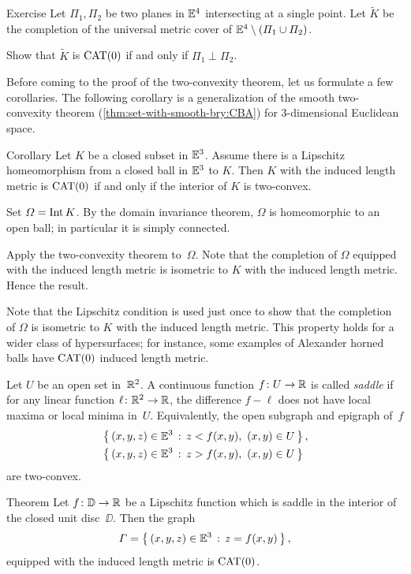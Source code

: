 \begin{thm}{Exercise}\label{ex:two-planes}
Let $\Pi_1,\Pi_2$ be two planes in $\mathbb{E}^4$ intersecting at a single point.
Let $\tilde K$ be the completion of the universal metric cover of $\mathbb{E}^4\setminus(\varPi_1\cup\varPi_2)$.

Show that 
$\tilde K$ is $\mathrm{CAT}(0)$ if and only if $\Pi_1\perp\Pi_2$.

\end{thm}

Before coming to the proof of the two-convexity theorem, 
let us formulate a few corollaries.
The following corollary is a generalization of the smooth two-convexity theorem (\ref{thm:set-with-smooth-bry:CBA}) for 3-dimensional Euclidean space.

\begin{thm}{Corollary}\label{cor:shefel}
Let $K$ be a closed subset in $\mathbb{E}^3$.
Assume there is a Lipschitz homeomorphism from a closed ball in $\mathbb{E}^3$ to $K$.
Then $K$ with the induced length metric is $\mathrm{CAT}(0)$ if and only if the interior of $K$ is two-convex.
\end{thm}

Set $\varOmega=\operatorname{\rm Int}\nolimits K$.
By the domain invariance theorem, $\Omega$ is homeomorphic to an open ball; in particular it is simply connected.

Apply the two-convexity theorem to~$\Omega$.
Note that the completion of $\Omega$ equipped with the induced length metric 
is isometric to $K$ with the induced length metric.
Hence the result.
\qeds

Note that the Lipschitz condition is used just once to show that the completion of $\Omega$ is isometric to $K$ with the induced length metric.
This property holds for a wider class of hypersurfaces;
for instance, some examples of Alexander horned balls have $\mathrm{CAT}(0)$ induced length metric.

Let $U$ be an open set in~$\mathbb{R}^2$.
A continuous function $f\colon U\to\mathbb{R}$ is called 
\emph{saddle} 
if for any linear function $\ell\colon\mathbb{R}^2\to\mathbb{R}$, the difference 
$f-\ell$
does not have local maxima or local minima in~$U$.
Equivalently, the open subgraph and epigraph of~$f$
\begin{align*}
&\left\{\,{(x,y,z)\in\mathbb{E}^3}\,:\,{z<f(x,y),\ (x,y)\in U}\,\right\},
\\
&\left\{\,{(x,y,z)\in\mathbb{E}^3}\,:\,{z>f(x,y),\ (x,y)\in U}\,\right\}
\end{align*}
are two-convex. 

\begin{thm}{Theorem}\label{thm:shefel-graph}
Let $f\colon\mathbb{D}\to \mathbb{R}$ be a Lipschitz function which is saddle in the interior of the closed unit disc~$\DD$. 
Then the graph
\[\varGamma=\left\{\,{(x,y,z)\in \mathbb{E}^3}\,:\,{z=f(x,y)}\,\right\},\] 
equipped with the induced length metric is $\mathrm{CAT}(0)$.
\end{thm}

